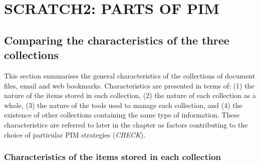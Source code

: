 \newpage
\section{SCRATCH2: PARTS OF PIM}
\label{exp-study:qual-results}


\newpage
\subsection{Comparing the characteristics of the three collections}
\label{exp-study:item_characteristics}

This section summarises the general characteristics of the collections of document files, email and web bookmarks. 
Characteristics are presented in terms of:
(1) the nature of the items stored in each collection,
(2) the nature of each collection as a whole,
(3) the nature of the tools used to manage each collection,
and (4) the existence of other collections containing the same type of information.
These characteristics are referred to later in the chapter as factors contributing to the choice of particular PIM strategies (\textit{CHECK}).


\subsubsection{Characteristics of the items stored in each collection}

